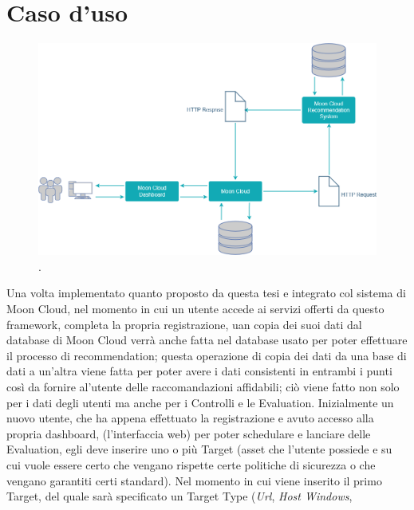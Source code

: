 \chapter{Caso d'uso}\label{chp:05-usecase}
\begin{figure}[ht!]
    \centering
    \includegraphics[scale=0.38]{images/UML_MoonCloud_HowToDo.png}
    \caption{.}
    \label{fig:UML_MoonCloud_HowToDo}
\end{figure}
%
Una volta implementato quanto proposto da questa tesi e integrato col sistema di Moon Cloud, nel momento in cui un utente 
accede ai servizi offerti da questo framework, completa la propria registrazione, uan copia dei suoi dati dal database di 
Moon Cloud verrà anche fatta nel database usato per poter effettuare il processo di recommendation; questa operazione di 
copia dei dati da una base di dati a un'altra viene fatta per poter avere i dati consistenti in entrambi i punti così da 
fornire al'utente delle raccomandazioni affidabili; ciò viene fatto non solo per i dati degli utenti ma anche per i Controlli 
e le Evaluation.\hfill\break
Inizialmente un nuovo utente, che ha appena effettuato la registrazione e avuto accesso alla propria dashboard, (l'interfaccia 
web) per poter schedulare e lanciare delle Evaluation, egli deve inserire uno o più Target (asset che l'utente possiede e su 
cui vuole essere certo che vengano rispette certe politiche di sicurezza o che vengano garantiti certi standard).\hfill\break
Nel momento in cui viene inserito il primo Target, del quale sarà specificato un Target Type (\textit{Url}, \textit{Host Windows}, 
